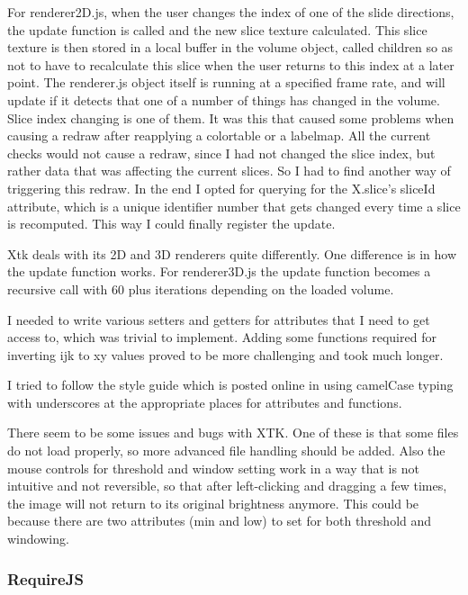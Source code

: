 \documentclass[a4paper,11pt,twoside]{article}
\begin{document}
For renderer2D.js, when the user changes the index of one of the slide directions, the update function is called and the new slice texture calculated. This slice texture is then stored in a local buffer in the volume object, called children so as not to have to recalculate this slice when the user returns to this index at a later point. The renderer.js object itself is running at a specified frame rate, and will update if it detects that one of a number of things has changed in the volume. Slice index changing is one of them. It was this that caused some problems when causing a redraw after reapplying a colortable or a labelmap. All the current checks would not cause a redraw, since I had not changed the slice index, but rather data that was affecting the current slices. So I had to find another way of triggering this redraw. In the end I opted for querying for the X.slice's sliceId attribute, which is a unique identifier number that gets changed every time a slice is recomputed. This way I could finally register the update. 




Xtk deals with its 2D and 3D renderers quite differently. One difference is in how the update function works. For renderer3D.js the update function becomes a recursive call with 60 plus iterations depending on the loaded volume.


I needed to write various setters and getters for attributes that I need to get access to, which was trivial to implement. Adding some functions required for inverting ijk to xy values proved to be more challenging and took much longer.

I tried to follow the style guide which is posted online in using camelCase typing with underscores at the appropriate places for attributes and functions.

There seem to be some issues and bugs with XTK. One of these is that some files do not load properly, so more advanced file handling should be added. Also the mouse controls for threshold and window setting work in a way that is not intuitive and not reversible, so that after left-clicking and dragging a few times, the image will not return to its original brightness anymore. This could be because there are two attributes (min and low) to set for both threshold and windowing.




\subsubsection{RequireJS}
\end{document}
